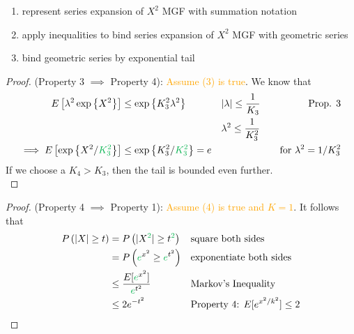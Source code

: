 \begin{tcolorbox}[colback=white!90!gray, title=Proof Technique: Bounding MGF of $X^2$]
\begin{enumerate}
    \item represent series expansion of $X^2$ MGF with summation notation 
    \item apply inequalities to bind series expansion of $X^2$ MGF with geometric series
    \item bind geometric series by exponential tail 
\end{enumerate}
\end{tcolorbox}

\begin{proof}
(Property 3 $\implies$ Property 4): \textcolor{orange}{Assume (3) is true}.
We know that 
\begin{align*}
    \Expect{\lambda^2 \exponential{X^2}} &\leq \exponential{K_3^2 \lambda^2} && |\lambda| \leq \frac{1}{K_3} &&& \text{Prop. 3} \\
    & && \lambda^2 \leq \frac{1}{K_3^2} &&&  \\
    \implies \Expect{\exponential{X^2/\textcolor{\dgreen}{K_3^2}}} &\leq \exponential{K_3^2 / \textcolor{\dgreen}{K_3^2}} = e && &&& \text{for $\lambda^2 = 1/K_3^2$} 
\end{align*}
If we choose a $K_4 > K_3$, then the tail is bounded even further.  \\ 
\end{proof}

\begin{proof}
(Property 4 $\implies$ Property 1): \textcolor{orange}{Assume (4) is true and $K = 1$}. It follows that 
\begin{align*}
    \Prob{|X| \geq t} &= \Prob{|X^{\textcolor{\dgreen}{2}}| \geq t^{\textcolor{\dgreen}{2}}} && 
        \text{square both sides} \\ 
    &= \Prob{\textcolor{\dgreen}{e}^{x^2} \geq \textcolor{\dgreen}{e}^{t^2}} &&
        \text{exponentiate both sides} \\ 
    &\leq \frac{E[\textcolor{\dgreen}{e}^{x^2}]}{\textcolor{\dgreen}{e}^{t^2}} &&
        \text{Markov's Inequality} \\ 
    &\leq 2e^{-t^2} &&
        \text{Property 4: $E[e^{x^2/k^2}] \leq 2$}
\end{align*}
\end{proof}

